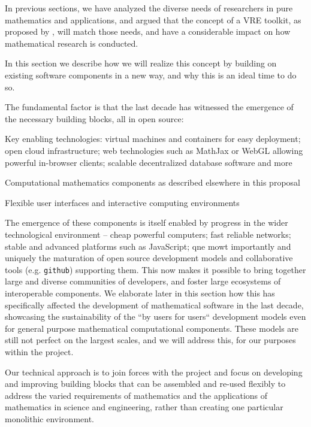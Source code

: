 In previous sections, we have analyzed the diverse needs of
researchers in pure mathematics and applications, and argued that the
concept of a VRE toolkit, as proposed by \TheProject, will match those
needs, and have a considerable impact on how mathematical research is
conducted.

In this section we describe how we will realize this concept by
building on existing software components in a new way, and why
this is an ideal time to do so.
\begin{framed}
  The fundamental factor is that the last decade has witnessed the
  emergence of the necessary building blocks, all in open source:
  \begin{compactitem}
  \item Key enabling technologies: virtual machines and containers for easy
    deployment; open cloud infrastructure; web technologies
    such as MathJax or WebGL allowing powerful in-browser clients; scalable
    decentralized database software and more
  \item Computational mathematics components as described elsewhere in
    this proposal
  \item Flexible user interfaces and interactive computing environments
  \end{compactitem}
\end{framed}

The emergence of these components is itself enabled by progress in the
wider technological environment -- cheap powerful computers; fast
reliable networks; stable and advanced platforms such as JavaScript;
qne mowt importantly and uniquely the maturation of open source
development models and collaborative tools (e.g. \texttt{github})
supporting them. This now
makes it possible to  bring together large and diverse communities of
developers, and foster large ecosystems of interoperable
components. We elaborate later in this section how this has
specifically affected the development of mathematical software in the
last decade, showcasing the sustainability of the ``by users for
users`` development models even for general purpose mathematical
computational components. These models are still not perfect on the
largest scales, and we will address this, for our purposes within the project.


\begin{frame}
  Our technical approach is to join forces with the \Jupyter project and focus on developing
  and improving building blocks that can be
  assembled and re-used flexibly to address the varied
  requirements of mathematics and the applications of mathematics in
  science and engineering, rather than creating one particular
  monolithic environment.
\end{frame}
